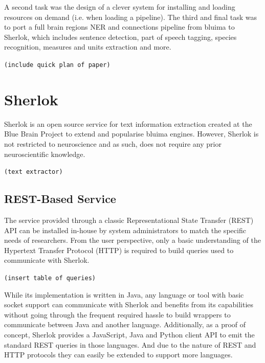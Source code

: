\documentclass{article}
\newcommand{\TODO}[1]{\texttt{\textcolor{YellowOrange}{(#1)}}} %
\begin{document}
A second task was the design of a clever system for installing and loading resources on demand (i.e.
when loading a pipeline). The third and final task was to port a full brain regions NER and
connections pipeline from bluima to Sherlok, which includes sentence detection, part of speech
tagging, species recognition, measures and units extraction and more.

\TODO{include quick plan of paper}

\section{Sherlok}

Sherlok is an open source service for text information extraction created at the Blue Brain Project
to extend and popularise bluima engines. However, Sherlok is not restricted to neuroscience and as
such, does not require any prior neuroscientific knowledge.

\TODO{text extractor}



\subsection{REST-Based Service}

The service provided through a classic Representational State Transfer (REST) API can be installed
in-house by system administrators to match the specific needs of researchers. From the user
perspective, only a basic understanding of the Hypertext Transfer Protocol (HTTP) is required to
build queries used to communicate with Sherlok.

\TODO{insert table of queries}

While its implementation is written in Java, any language or tool with basic socket support can
communicate with Sherlok and benefits from its capabilities without going through the frequent
required hassle to build wrappers to communicate between Java and another language. Additionally,
as a proof of concept, Sherlok provides a JavaScript, Java and Python client API to emit the
standard REST queries in those languages. And due to the nature of REST and HTTP protocols they can
easily be extended to support more languages.
\end{document}
